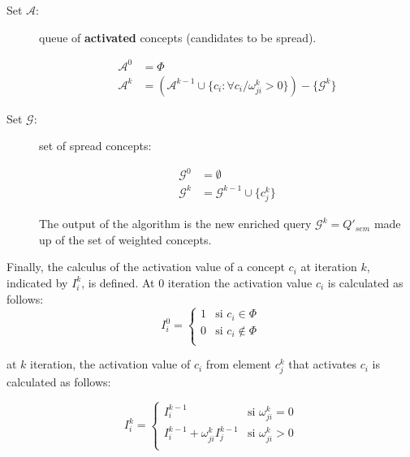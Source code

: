 \documentclass{llncs}
\begin{document}
\begin{description}

\item [Set $\mathcal{A}$:] queue of {\bf activated} concepts (candidates to be
spread).

\begin{align}
 \mathcal{A}^0 &=\Phi \\
 \mathcal{A}^k &=(\mathcal{A}^{k-1} \cup \{c_i: {\forall c_i /  \omega_{ji}^k
>0}\})-{ \{\mathcal{G}^k}\}
\end{align}

\item [Set $\mathcal{G}$:] set of spread concepts:

\begin{align}
 \mathcal{G}^0 &=\emptyset \\
 \mathcal{G}^k &= \mathcal{G}^{k-1} \cup \{c_j^k\}
\end{align}

The output of the algorithm is the new enriched query $\mathcal{G}^k = Q'_{sem}$
made up of the set of weighted concepts.

\end{description}

Finally, the calculus of the activation value of a concept $c_i$
at iteration $k$, indicated by $I^k_i$, is defined. At $0$ iteration the
activation value $c_i$ is calculated as follows:
\begin{equation}
I^0_i=\begin{cases}%
  1 & \text{si $c_i \in \Phi$} \\%
  0 & \text{si $c_i \notin \Phi$} \\%
 \end{cases}
\end{equation}

at $k$ iteration, the activation value of $c_i$ from element
$c_j^{k}$ that activates $c_i$ is calculated as follows:

\begin{equation}
I^k_i=\begin{cases}%
  I^{k-1}_i & \text{si } \omega_{ji}^k = 0 \\%
  I^{k-1}_i + \omega_{ji}^k I^{k-1}_j  & \text{si }  \omega_{ji}^k > 0  \\%
 \end{cases}
\end{equation}
\end{document}
